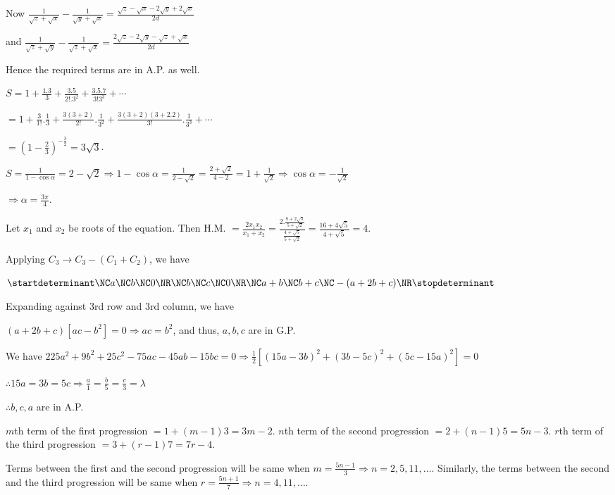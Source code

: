   Now $\frac{1}{\sqrt{z} + \sqrt{x}} - \frac{1}{\sqrt{y} + \sqrt{x}} = \frac{\sqrt{z} - \sqrt{x} - 2\sqrt{y}
    + 2\sqrt{x}}{2d}$

  and $\frac{1}{\sqrt{z} + \sqrt{y}} - \frac{1}{\sqrt{z} + \sqrt{x}} = \frac{2\sqrt{z} - 2\sqrt{y}
    - \sqrt{z} + \sqrt{x}}{2d}$

  Hence the required terms are in A.P. as well.
\item $S = 1 + \frac{1.3}{3} + \frac{3.5}{2!.3^2} + \frac{3.5.7}{3!3^3} + \cdots$

  $= 1 + \frac{3}{1!}.\frac{1}{3} + \frac{3(3 + 2)}{2!}.\frac{1}{3^2} + \frac{3(3 + 2)(3 +
  2.2)}{3!}.\frac{1}{3^3} + \cdots$

  $= \left(1 - \frac{2}{3}\right)^{-\frac{3}{2}} = 3\sqrt{3}$.
\item $S = \frac{1}{1 - \cos\alpha} = 2 - \sqrt{2} \Rightarrow 1 - \cos\alpha = \frac{1}{2 - \sqrt{2}}
  = \frac{2 + \sqrt{2}}{4 - 2} = 1 + \frac{1}{\sqrt{2}}\Rightarrow \cos\alpha = -\frac{1}{\sqrt{2}}$

  $\Rightarrow \alpha = \frac{3\pi}{4}$.
\item Let $x_1$ and $x_2$ be roots of the equation. Then H.M. $= \frac{2x_1x_2}{x_1 + x_2} = \frac{2.\frac{8
    + 2\sqrt{5}}{5 + \sqrt{2}}}{\frac{4 + \sqrt{5}}{5 + \sqrt{2}}} = \frac{16 + 4\sqrt{5}}{4 + \sqrt{5}} = 4$.
\item Applying $C_3\rightarrow C_3 - (C_1 + C_2)$, we have

  $\startdeterminant\NC a\NC b\NC 0\NR\NC b\NC c\NC 0\NR\NC a + b\NC b + c\NC -(a + 2b + c)\NR\stopdeterminant$

  Expanding against $3$rd row and $3$rd column, we have

  $(a + 2b + c)[ac - b^2] = 0 \Rightarrow ac = b^2$, and thus, $a, b, c$ are in G.P.
\item We have $225a^2 + 9b^2 + 25c^2 - 75ac - 45ab - 15bc = 0\Rightarrow \frac{1}{2}[(15a - 3b)^2 + (3b -
  5c)^2 + (5c - 15a)^2] = 0$

  $\therefore 15a = 3b = 5c \Rightarrow \frac{a}{1} = \frac{b}{5} = \frac{c}{3} = \lambda$

  $\therefore b, c, a$ are in A.P.
\item $m$th term of the first progression $= 1 + (m - 1)3 = 3m - 2$. $n$th term of the second progression $=
  2 + (n - 1)5 = 5n - 3$. $r$th term of the third progression $= 3 + (r - 1)7 = 7r - 4$.

  Terms between the first and the second progression will be same when $m = \frac{5n - 1}{3}\Rightarrow n =
  2, 5, 11, \ldots$. Similarly, the terms between the second and the third progression will be same when $r
  = \frac{5n + 1}{7}\Rightarrow n = 4, 11, \ldots$.

